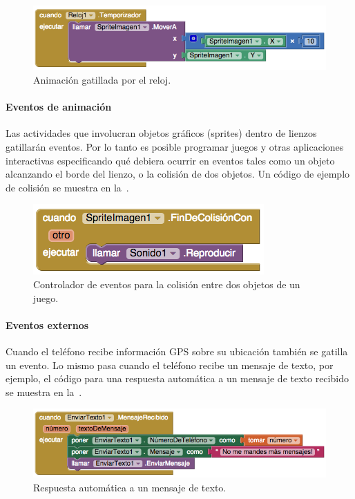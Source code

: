 \documentclass[letterpaper]{article}
\begin{document}
\begin{figure}[H]
\centering
\includegraphics[scale=0.5]{figures/ClockEvent}
\caption{Animación gatillada por el reloj.}
\label{fig:clockEvent}
\end{figure}

\paragraph{Eventos de animación}
Las actividades que involucran objetos gráficos (sprites) dentro de
lienzos gatillarán eventos. Por lo tanto es posible programar juegos y
otras aplicaciones interactivas especificando qué debiera ocurrir en
eventos tales como un objeto alcanzando el borde del lienzo, o la
colisión de dos objetos. Un código de ejemplo de colisión se muestra
en la~.

\begin{figure}[H]
\centering
\includegraphics[scale=0.5]{figures/Colision}
\caption{Controlador de eventos para la colisión entre dos objetos de
  un juego.}
\label{fig:colision}
\end{figure}

\paragraph{Eventos externos}

Cuando el teléfono recibe información GPS sobre su ubicación también
se gatilla un evento. Lo mismo pasa cuando el teléfono recibe un
mensaje de texto, por ejemplo, el código para una respuesta automática
a un mensaje de texto recibido se muestra en la~.

\begin{figure}[H]
\centering
\includegraphics[scale=0.5]{figures/AutoReply}
\caption{Respuesta automática a un mensaje de texto.}
\label{fig:colision}
\end{figure}
\end{document}
